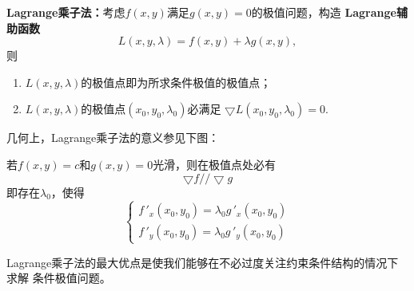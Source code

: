 \begin{thx}
	{\bf Lagrange乘子法：}考虑$f(x,y)$满足$g(x,y)=0$的极值问题，构造
	{\bf Lagrange辅助函数}
	$${L(x,y,\lambda)=f(x,y)+\lambda g(x,y)},$$
	则
	\begin{enumerate}%
	  \item $L(x,y,\lambda)$的极值点即为所求条件极值的极值点； 
	  \item $L(x,y,\lambda)$的极值点$(x_0,y_0,\lambda_0)$必满足 
	  $\bigtriangledown L(x_0,y_0,\lambda_0)=0.$
	\end{enumerate}
\end{thx}

几何上，Lagrange乘子法的意义参见下图：
\begin{center}
\end{center}
若$f(x,y)=c$和$g(x,y)=0$光滑，则在极值点处必有
$${\bigtriangledown f // \bigtriangledown g}$$
即存在$\lambda_0$，使得
$$
{\left\{\begin{array}{l}
	f\,'_x(x_0,y_0)=\lambda_0g\,'_x(x_0,y_0)\\
	f\,'_y(x_0,y_0)=\lambda_0g\,'_y(x_0,y_0)
\end{array}
\right.}$$

Lagrange乘子法的最大优点是使我们能够在不必过度关注约束条件结构的情况下求解
条件极值问题。


